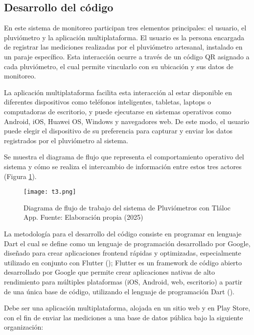 \subsection{Desarrollo del código}
En este sistema de monitoreo participan tres elementos principales: el usuario, el pluviómetro y la aplicación multiplataforma. El usuario es la persona encargada de registrar las mediciones realizadas por el pluviómetro artesanal, instalado en un paraje específico. Esta interacción ocurre a través de un código QR asignado a cada pluviómetro, el cual permite vincularlo con su ubicación y sus datos de monitoreo.

La aplicación multiplataforma facilita esta interacción al estar disponible en diferentes dispositivos como teléfonos inteligentes, tabletas, laptops o computadoras de escritorio, y puede ejecutarse en sistemas operativos como Android, iOS, Huawei OS, Windows y navegadores web. De este modo, el usuario puede elegir el dispositivo de su preferencia para capturar y enviar los datos registrados por el pluviómetro al sistema.

Se muestra el diagrama de flujo que representa el comportamiento operativo del sistema y cómo se realiza el intercambio de información entre estos tres actores (Figura \ref{t3}).
\begin{figure}[h!]
\centering
  \texttt{[image: t3.png]}
  \caption{Diagrama de flujo de trabajo del sistema de Pluviómetros con Tláloc App. Fuente: Elaboración propia (2025)}
  \label{t3}
\end{figure}

La metodología para el desarrollo del código consiste en programar en lenguaje Dart el cual se define como un lenguaje de programación desarrollado por Google, diseñado para crear aplicaciones frontend rápidas y optimizadas, especialmente utilizado en conjunto con Flutter (\cite{dart}); Flutter es un framework de código abierto desarrollado por Google que permite crear aplicaciones nativas de alto rendimiento para múltiples plataformas (iOS, Android, web, escritorio) a partir de una única base de código, utilizando el lenguaje de programación Dart (\cite{flutter_multiplataforma}).

Debe ser una aplicación multiplataforma, alojada en un sitio web y en Play Store, con el fin de enviar las mediciones a una base de datos pública bajo la siguiente organización:



